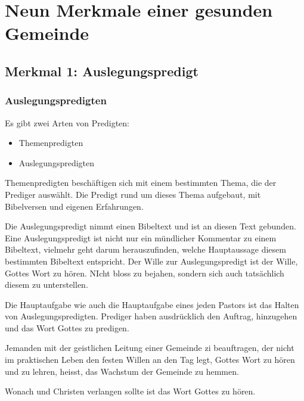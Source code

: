 \documentclass{../../inc/mybib}
\begin{document}
\section*{Neun Merkmale einer gesunden Gemeinde}
\subsection*{Merkmal 1: Auslegungspredigt}
\subsubsection*{Auslegungspredigten}
Es gibt zwei Arten von Predigten:
\begin{itemize}
    \item Themenpredigten
    \item Auslegungspredigten
\end{itemize}
Themenpredigten beschäftigen sich mit einem bestimmten Thema, die der Prediger auswählt. Die Predigt rund um dieses Thema aufgebaut, mit Bibelversen und eigenen Erfahrungen.

Die Auslegungspredigt nimmt einen Bibeltext und ist an diesen Text gebunden. Eine Auslegungspredigt ist nicht nur ein mündlicher Kommentar zu einem Bibeltext, vielmehr geht darum herauszufinden, welche Hauptaussage diesem bestimmten Bibeltext entspricht. Der Wille zur Auslegungspredigt ist der Wille, Gottes Wort zu hören. NIcht bloss zu bejahen, sondern sich auch tatsächlich diesem zu unterstellen.

Die Hauptaufgabe wie auch die Hauptaufgabe eines jeden Pastors ist das Halten von Auslegungspredigten. Prediger haben ausdrücklich den Auftrag, hinzugehen und das Wort Gottes zu predigen.

Jemanden mit der geistlichen Leitung einer Gemeinde zi beauftragen, der nicht im praktischen Leben den festen Willen an den Tag legt, Gottes Wort zu hören und zu lehren, heisst, das Wachstum der Gemeinde zu hemmen.

Wonach und Christen verlangen sollte ist das Wort Gottes zu hören.
\end{document}
